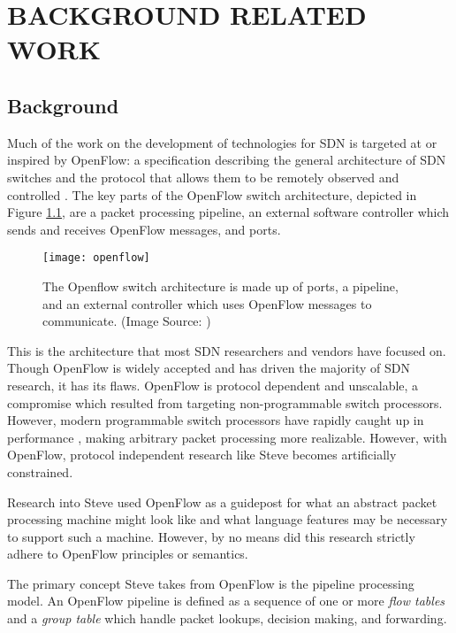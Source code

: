 \chapter{BACKGROUND RELATED WORK}
\label{ch:related}

\section{Background}
\label{rel:openflow}

Much of the work on the development of technologies for SDN is targeted at or 
inspired by OpenFlow: a specification describing the general architecture of SDN 
switches and the protocol that allows them to be remotely observed and controlled 
\cite{openflow_spec}. 
The key parts of the OpenFlow switch architecture, depicted in Figure \ref{fg:openflow_switch}, are a packet 
processing pipeline, an external software controller which sends and receives
OpenFlow messages, and ports. 

\begin{figure}[ht]
\centering
\texttt{[image: openflow]}
\caption{The Openflow switch architecture is made up of ports, a pipeline,
and an external controller which uses OpenFlow messages to communicate. (Image Source: \cite{openflow_spec})}
\label{fg:openflow_switch}
\end{figure}

This is the architecture that most SDN researchers and vendors have focused on.
Though OpenFlow is widely accepted and has driven the majority of SDN research,
it has its flaws.
OpenFlow is protocol dependent and unscalable, a compromise which resulted from targeting non-programmable switch processors. However, modern programmable switch processors have rapidly caught up in performance \cite{bosshart2013forwarding}, making arbitrary packet processing more realizable. However, with OpenFlow, protocol independent research like Steve becomes artificially constrained.

Research into Steve used OpenFlow as a guidepost for what an abstract
packet processing machine might look like and what language features may be
necessary to support such a machine. However, by no means did this research
strictly adhere to OpenFlow principles or semantics.

The primary concept Steve takes from OpenFlow is the pipeline processing model.
An OpenFlow pipeline is defined as a sequence
of one or more \textit{flow tables} and a \textit{group table} which handle
packet lookups, decision making, and forwarding.

